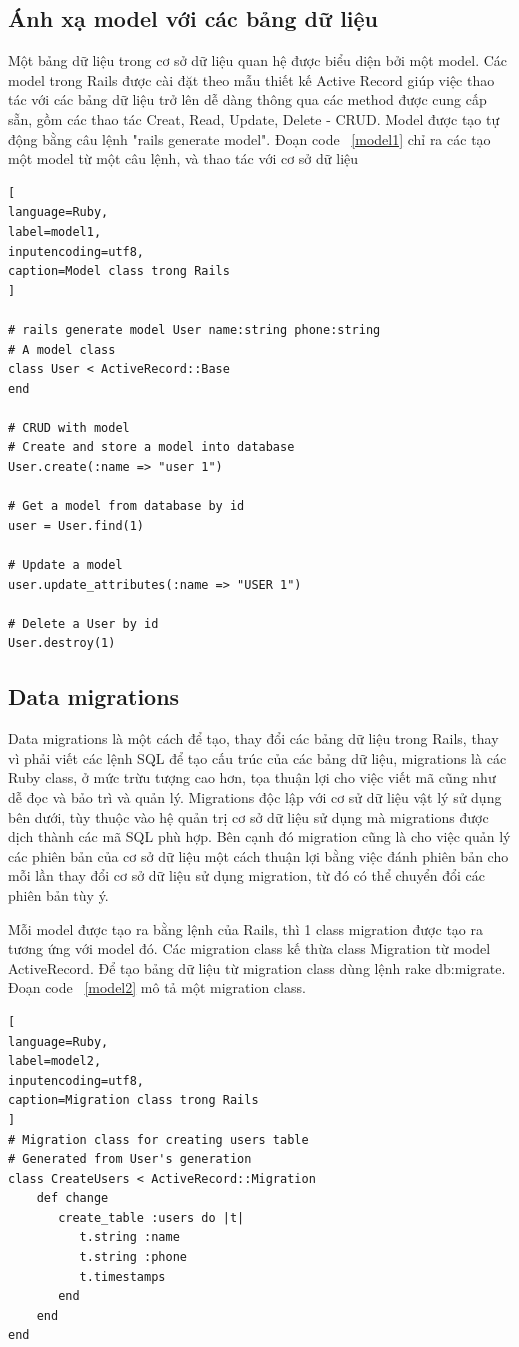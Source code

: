 \subsection{Ánh xạ model với các bảng dữ liệu}
Một bảng dữ liệu trong cơ sở dữ liệu quan hệ được biểu diện bởi một model. Các model trong Rails được cài đặt theo mẫu thiết kế Active Record giúp việc thao tác với các bảng dữ liệu trở lên dễ dàng thông qua các method được cung cấp sẵn, gồm các thao tác Creat, Read, Update, Delete - CRUD.
Model được tạo tự động bằng câu lệnh "rails generate model". Đoạn code ~\ref{model1} chỉ ra các tạo một model từ một câu lệnh, và thao tác với cơ sở dữ liệu

\begin{lstlisting}[
language=Ruby,
label=model1,
inputencoding=utf8,
caption=Model class trong Rails
]

# rails generate model User name:string phone:string
# A model class
class User < ActiveRecord::Base
end

# CRUD with model
# Create and store a model into database
User.create(:name => "user 1")

# Get a model from database by id
user = User.find(1)

# Update a model
user.update_attributes(:name => "USER 1")

# Delete a User by id
User.destroy(1) 

\end{lstlisting}

\subsection{Data migrations}
Data migrations là một cách để tạo, thay đổi các bảng dữ liệu trong Rails, thay vì phải viết các lệnh SQL để tạo cấu trúc của các bảng dữ liệu, migrations là các Ruby class, ở mức trừu tượng cao hơn, tọa thuận lợi cho việc viết mã cũng như dễ đọc và bảo trì và quản lý. Migrations độc lập với cơ sử dữ liệu vật lý sử dụng bên dưới, tùy thuộc vào hệ quản trị cơ sở dữ liệu sử dụng mà migrations được dịch thành các mã SQL phù hợp. Bên cạnh đó migration cũng là cho việc quản lý các phiên bản của cơ sở dữ liệu một cách thuận lợi bằng việc đánh phiên bản cho mỗi lần thay đổi cơ sở dữ liệu sử dụng migration, từ đó có thể chuyển đổi các phiên bản tùy ý. \newline

Mỗi model được tạo ra bằng lệnh của Rails, thì 1 class migration được tạo ra tương ứng với model đó. Các migration class kế thừa class Migration từ model ActiveRecord. Để tạo bảng dữ liệu từ migration class dùng lệnh rake db:migrate. Đoạn code ~\ref{model2} mô tả một migration class.
 \begin{lstlisting}[
language=Ruby,
label=model2,
inputencoding=utf8,
caption=Migration class trong Rails
]
# Migration class for creating users table
# Generated from User's generation
class CreateUsers < ActiveRecord::Migration
    def change  
       create_table :users do |t|
          t.string :name
          t.string :phone
          t.timestamps
       end
    end
end
\end{lstlisting}


